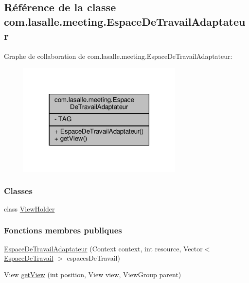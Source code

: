 \hypertarget{classcom_1_1lasalle_1_1meeting_1_1_espace_de_travail_adaptateur}{}\subsection{Référence de la classe com.\+lasalle.\+meeting.\+Espace\+De\+Travail\+Adaptateur}
\label{classcom_1_1lasalle_1_1meeting_1_1_espace_de_travail_adaptateur}


Graphe de collaboration de com.\+lasalle.\+meeting.\+Espace\+De\+Travail\+Adaptateur\+:\nopagebreak
\begin{figure}[H]
\begin{center}
\leavevmode
\includegraphics[width=234pt]{classcom_1_1lasalle_1_1meeting_1_1_espace_de_travail_adaptateur__coll__graph}
\end{center}
\end{figure}
\subsubsection*{Classes}
\begin{DoxyCompactItemize}
\item 
class \hyperlink{classcom_1_1lasalle_1_1meeting_1_1_espace_de_travail_adaptateur_1_1_view_holder}{View\+Holder}
\end{DoxyCompactItemize}
\subsubsection*{Fonctions membres publiques}
\begin{DoxyCompactItemize}
\item 
\hyperlink{classcom_1_1lasalle_1_1meeting_1_1_espace_de_travail_adaptateur_a236d4cbea7b551e4faf638b578c1f980}{Espace\+De\+Travail\+Adaptateur} (Context context, int resource, Vector$<$ \hyperlink{classcom_1_1lasalle_1_1meeting_1_1_espace_de_travail}{Espace\+De\+Travail} $>$ espaces\+De\+Travail)
\item 
View \hyperlink{classcom_1_1lasalle_1_1meeting_1_1_espace_de_travail_adaptateur_a288239cdb1a4e23274361c4a5dc503ba}{get\+View} (int position, View view, View\+Group parent)
\end{DoxyCompactItemize}
